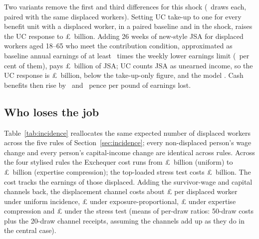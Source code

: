 Two variants remove the first and third differences for this shock (\genObrDraws~draws each, paired with the same displaced workers). Setting UC take-up to one for every benefit unit with a displaced worker, in a paired baseline and in the shock, raises the UC response to \pounds\genTkObrTakeupUcBn~billion. Adding 26 weeks of new-style JSA for displaced workers aged 18--65 who meet the contribution condition, approximated as baseline annual earnings of at least \genJsaLelWeeks~times the weekly lower earnings limit (\genTkObrJsaEligiblePct~per cent of them), pays \pounds\genTkObrJsaJsaBn~billion of JSA; UC counts JSA as unearned income, so the UC response is \pounds\genTkObrJsaUcBn~billion, below the take-up-only figure, and the model \genTkJsaTaxWords. Cash benefits then rise by \genTkObrTakeupCashPence~and \genTkObrJsaCashPence~pence per pound of earnings lost.

\subsection{Who loses the job}
\label{sec:results-incidence}

Table~\ref{tab:incidence} reallocates the same expected number of displaced workers across the five rules of Section~\ref{sec:incidence}; every non-displaced person's wage change and every person's capital-income change are identical across rules. Across the four stylised rules the Exchequer cost runs from \pounds\genIncUniformCostMeanBn~billion (uniform) to \pounds\genIncCompressionCostMeanBn~billion (expertise compression); the top-loaded stress test costs \pounds\genIncKleinCostMeanBn~billion. The cost tracks the earnings of those displaced. Adding the survivor-wage and capital channels back, the displacement channel costs about \pounds\genFamPerWorkerUniformGbp{} per displaced worker under uniform incidence, \pounds\genFamPerWorkerExposureGbp{} under exposure-proportional, \pounds\genFamPerWorkerCompressionGbp{} under expertise compression and \pounds\genFamPerWorkerKleinGbp{} under the stress test (means of per-draw ratios: 50-draw costs plus the 20-draw channel receipts, assuming the channels add up as they do in the central case).

